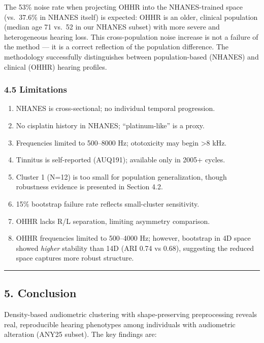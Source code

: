 \documentclass[
]{article}
\providecommand{\tightlist}{%
  \setlength{\itemsep}{0pt}\setlength{\parskip}{0pt}}
\begin{document}
The 53\% noise rate when projecting OHHR into the NHANES-trained space
(vs.~37.6\% in NHANES itself) is expected: OHHR is an older, clinical population
(median age 71 vs.~52 in our NHANES subset) with more severe and heterogeneous
hearing loss. This cross-population noise increase is not a failure of the
method --- it is a correct reflection of the population difference. The
methodology successfully distinguishes between population-based (NHANES) and
clinical (OHHR) hearing profiles.

\subsubsection{4.5 Limitations}\label{limitations}

\begin{enumerate}
\def\labelenumi{\arabic{enumi}.}
\tightlist
\item
  NHANES is cross-sectional; no individual temporal progression.
\item
  No cisplatin history in NHANES; ``platinum-like'' is a proxy.
\item
  Frequencies limited to 500--8000 Hz; ototoxicity may begin \textgreater8 kHz.
\item
  Tinnitus is self-reported (AUQ191); available only in 2005+ cycles.
\item
  Cluster 1 (N=12) is too small for population generalization, though robustness
  evidence is presented in Section 4.2.
\item
  15\% bootstrap failure rate reflects small-cluster sensitivity.
\item
  OHHR lacks R/L separation, limiting asymmetry comparison.
\item
  OHHR frequencies limited to 500--4000 Hz; however, bootstrap in 4D space
  showed \emph{higher} stability than 14D (ARI 0.74 vs 0.68), suggesting the
  reduced space captures more robust structure.
\end{enumerate}

\begin{center}\rule{0.5\linewidth}{0.5pt}\end{center}

\subsection{5. Conclusion}\label{conclusion}

Density-based audiometric clustering with shape-preserving preprocessing reveals
real, reproducible hearing phenotypes among individuals with audiometric
alteration (ANY25 subset). The key findings are:
\end{document}

